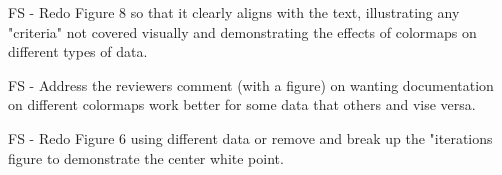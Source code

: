 
FS - Redo Figure 8 so that it clearly aligns with the text, illustrating any "criteria" not covered visually and demonstrating the effects of colormaps on different types of data. 

FS - Address the reviewers comment (with a figure) on wanting documentation on different colormaps work better for some data that others and vise versa.

FS - Redo Figure 6 using different data or remove and break up the "iterations figure to demonstrate the center white point.